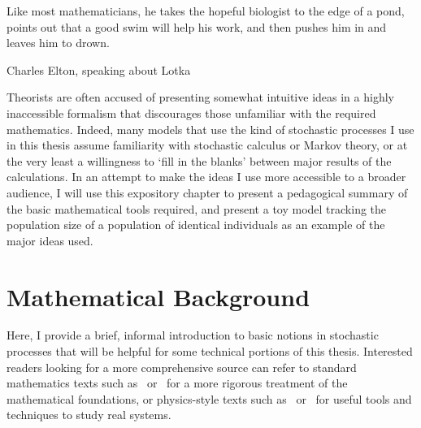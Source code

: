 \epigraph{\justifying Like most mathematicians, he takes the hopeful biologist to the edge of a pond, points out that a good swim will help his work, and then pushes him in and leaves him to drown.}{Charles Elton, speaking about Lotka~\citep{elton_eppur_1935}}

Theorists are often accused of presenting somewhat intuitive ideas in a highly inaccessible formalism that discourages those unfamiliar with the required mathematics. Indeed, many models that use the kind of stochastic processes I use in this thesis assume familiarity with stochastic calculus or Markov theory, or at the very least a willingness to `fill in the blanks' between major results of the calculations. In an attempt to make the ideas I use more accessible to a broader audience, I will use this expository chapter to present a pedagogical summary of the basic mathematical tools required, and present a toy model tracking the population size of a population of identical individuals as an example of the major ideas used.

\section{Mathematical Background}\label{sec_math_background}

Here, I provide a brief, informal introduction to basic notions in stochastic processes that will be helpful for some technical portions of this thesis. Interested readers looking for a more comprehensive source can refer to standard mathematics texts such as~\cite{oksendal_stochastic_1998} or~\cite{karatzas_brownian_1998} for a more rigorous treatment of the mathematical foundations, or physics-style texts such as~\cite{gardiner_stochastic_2009} or~\cite{van_kampen_stochastic_1981} for useful tools and techniques to study real systems.

